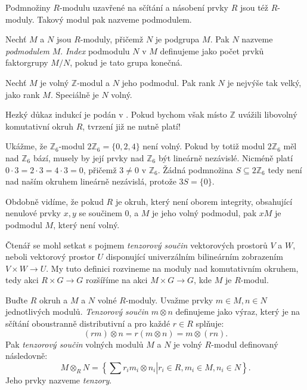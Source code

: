 \documentclass[12pt]{report}
\begin{document}
Podmnožiny $R$-modulu uzavřené na sčítání a násobení prvky $R$ jsou též $R$-moduly. Takový modul pak nazveme podmodulem.

\begin{definice}
Nechť $M$ a $N$ jsou $R$-moduly, přičemž $N$ je podgrupa $M$. Pak $N$ nazveme \textit{podmodulem} $M$. \textit{Index} podmodulu $N$ v $M$ definujeme jako počet prvků faktorgrupy $M / N$, pokud je tato grupa konečná.
\end{definice}

\begin{veta}\label{podmodul}
Nechť $M$ je volný $\mathbb{Z}$-modul a $N$ jeho podmodul. Pak rank $N$ je nejvýše tak velký, jako rank $M$. Speciálně je $N$ volný.
\end{veta}

Hezký důkaz indukcí je podán v \cite[Věta~1.3.8]{Pupik}. Pokud bychom však místo $\mathbb{Z}$ uvážili libovolný komutativní okruh $R$, tvrzení již ne nutně platí!
\begin{priklad}
Ukážme, že $\mathbb{Z}_6$-modul $2\mathbb{Z}_6 = \lbrace 0,2,4 \rbrace$ není volný. Pokud by totiž modul $2 \mathbb{Z}_6$ měl nad $\mathbb{Z}_6$ bází, musely by její prvky nad $\mathbb{Z}_6$ být lineárně nezávislé. Nicméně platí $0 \cdot 3 = 2 \cdot 3  = 4 \cdot 3 = 0$, přičemž $3 \neq 0$ v $\mathbb{Z}_6$. Žádná podmnožina $S \subseteq 2 \mathbb{Z}_6$ tedy není nad naším okruhem lineárně nezávislá, protože $3 S = \lbrace 0 \rbrace$.
\end{priklad}

Obdobně vidíme, že pokud $R$ je okruh, který není oborem integrity, obsahující nenulové prvky $x, y$ se součinem $0$, a $M$ je jeho volný podmodul, pak $x M$ je podmodul $M$, který není volný.

Čtenář se mohl setkat s pojmem \textit{tenzorový součin} vektorových prostorů $V$ a $W$, neboli vektorový prostor $U$ disponující univerzálním bilineárním zobrazením $V \times W \longrightarrow U$. My tuto definici rozvineme na moduly nad komutativním okruhem, tedy akci $R \times G \longrightarrow G$ rozšíříme na akci $M \times G \longrightarrow G$, kde $M$ je $R$-modul.

\begin{definice}
Buďte $R$ okruh a $M$ a $N$ volné $R$-moduly. Uvažme prvky $m \in M,n \in N$ jednotlivých modulů. \textit{Tenzorový součin} $m \otimes n$ definujeme jako výraz, který je na sčítání oboustranně distributivní a pro každé $r \in R$ splňuje:
\begin{equation*}
(rm) \otimes n = r (m \otimes n) = m \otimes (rn).
\end{equation*}
Pak \textit{tenzorový součin} volných modulů $M$ a $N$ je volný $R$-modul definovaný následovně:
\begin{equation*}
M  \otimes_R N = \left \lbrace \left. \sum r_i m_i \otimes n_i \right\vert r_i \in R, m_i \in M, n_i \in N \right \rbrace.
\end{equation*} 
Jeho prvky nazveme \textit{tenzory}.
\end{definice}
\end{document}
